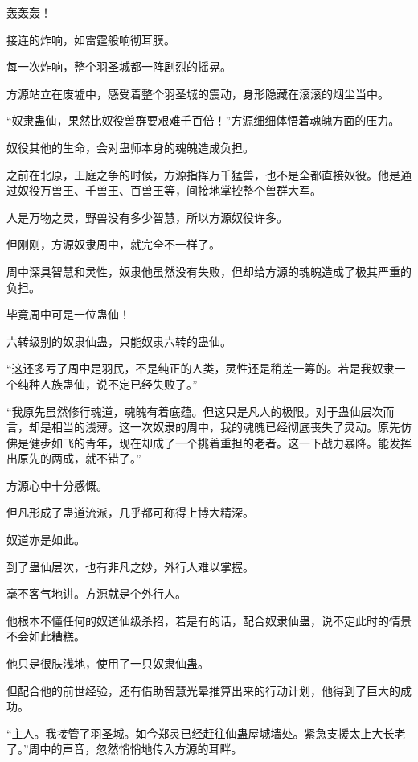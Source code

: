 
\begin{this_body}



轰轰轰！

接连的炸响，如雷霆般响彻耳膜。

每一次炸响，整个羽圣城都一阵剧烈的摇晃。

方源站立在废墟中，感受着整个羽圣城的震动，身形隐藏在滚滚的烟尘当中。

“奴隶蛊仙，果然比奴役兽群要艰难千百倍！”方源细细体悟着魂魄方面的压力。

奴役其他的生命，会对蛊师本身的魂魄造成负担。

之前在北原，王庭之争的时候，方源指挥万千猛兽，也不是全都直接奴役。他是通过奴役万兽王、千兽王、百兽王等，间接地掌控整个兽群大军。

人是万物之灵，野兽没有多少智慧，所以方源奴役许多。

但刚刚，方源奴隶周中，就完全不一样了。

周中深具智慧和灵性，奴隶他虽然没有失败，但却给方源的魂魄造成了极其严重的负担。

毕竟周中可是一位蛊仙！

六转级别的奴隶仙蛊，只能奴隶六转的蛊仙。

“这还多亏了周中是羽民，不是纯正的人类，灵性还是稍差一筹的。若是我奴隶一个纯种人族蛊仙，说不定已经失败了。”

“我原先虽然修行魂道，魂魄有着底蕴。但这只是凡人的极限。对于蛊仙层次而言，却是相当的浅薄。这一次奴隶的周中，我的魂魄已经彻底丧失了灵动。原先仿佛是健步如飞的青年，现在却成了一个挑着重担的老者。这一下战力暴降。能发挥出原先的两成，就不错了。”

方源心中十分感慨。

但凡形成了蛊道流派，几乎都可称得上博大精深。

奴道亦是如此。

到了蛊仙层次，也有非凡之妙，外行人难以掌握。

毫不客气地讲。方源就是个外行人。

他根本不懂任何的奴道仙级杀招，若是有的话，配合奴隶仙蛊，说不定此时的情景不会如此糟糕。

他只是很肤浅地，使用了一只奴隶仙蛊。

但配合他的前世经验，还有借助智慧光晕推算出来的行动计划，他得到了巨大的成功。

“主人。我接管了羽圣城。如今郑灵已经赶往仙蛊屋城墙处。紧急支援太上大长老了。”周中的声音，忽然悄悄地传入方源的耳畔。


\end{this_body}
